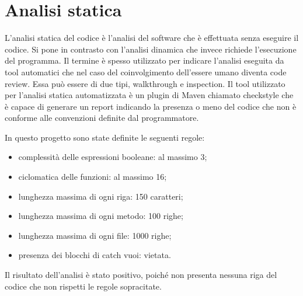 \section{Analisi statica}\label{sec:analisi-statica}

L'analisi statica del codice\cite{site:analisi_static} è l'analisi del software che è effettuata senza eseguire
il codice.
Si pone in contrasto con l'analisi dinamica che invece richiede l'esecuzione del
programma.
Il termine è spesso utilizzato per indicare l'analisi eseguita da tool
automatici che nel caso del coinvolgimento dell'essere umano diventa code review.
Essa può  essere di due tipi, \gls{walkthrough} e \gls{inspection}.
Il tool utilizzato per l'analisi statica automatizzata è un plugin di Maven
chiamato checkstyle\cite{site:checkstyle} che è capace di generare un report indicando la presenza o
meno del codice che non è conforme alle convenzioni definite dal programmatore.

In questo progetto sono state definite le seguenti regole:
\begin{itemize}
    \item complessità delle espressioni booleane: al massimo 3;
    \item \gls{ciclomatica} delle funzioni: al massimo 16;
    \item lunghezza massima di ogni riga: 150 caratteri;
    \item lunghezza massima di ogni metodo: 100 righe;
    \item lunghezza massima di ogni file: 1000 righe;
    \item presenza dei blocchi di catch vuoi: vietata.
\end{itemize}

Il risultato dell'analisi è stato positivo, poiché non presenta nessuna riga del codice che non rispetti le regole sopracitate.